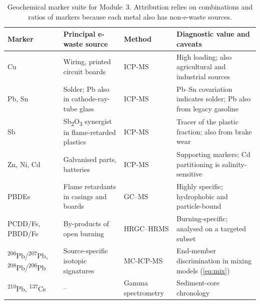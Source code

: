 \begin{table}[t]
\centering
\caption{Geochemical marker suite for Module~3. Attribution relies on combinations and ratios of markers because each metal also has non-e-waste sources.}
\label{tab:markers}
\footnotesize
\begin{tabularx}{\textwidth}{@{}L{2.6cm}YL{2.55cm}Y@{}}
\toprule
Marker & Principal e-waste source & Method & Diagnostic value and caveats\\
\midrule
Cu & Wiring, printed circuit boards & ICP-MS & High loading; also agricultural and industrial sources\\
Pb, Sn & Solder; Pb also in cathode-ray-tube glass & ICP-MS & Pb--Sn covariation indicates solder; Pb also from legacy gasoline\\
Sb & Sb\textsubscript{2}O\textsubscript{3} synergist in flame-retarded plastics & ICP-MS & Tracer of the plastic fraction; also from brake wear\\
Zn, Ni, Cd & Galvanised parts, batteries & ICP-MS & Supporting markers; Cd partitioning is salinity-sensitive\\
PBDEs & Flame retardants in casings and boards & GC--MS & Highly specific; hydrophobic and particle-bound\\
PCDD/Fs, PBDD/Fs & By-products of open burning & HRGC--HRMS & Burning-specific; analysed on a targeted subset\\
\textsuperscript{206}Pb/\textsuperscript{207}Pb, \textsuperscript{208}Pb/\textsuperscript{206}Pb & Source-specific isotopic signatures & MC-ICP-MS & End-member discrimination in mixing models (\cref{eq:mix})\\
\textsuperscript{210}Pb, \textsuperscript{137}Cs & -- & Gamma spectrometry & Sediment-core chronology\\
\bottomrule
\end{tabularx}
\end{table}
